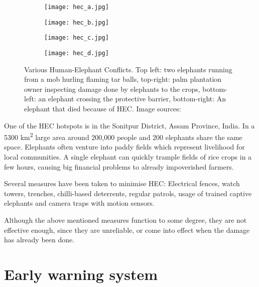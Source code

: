 \begin{figure}[ht]
    \begin{subfigure}{0.5\textwidth}
        \centering
        \texttt{[image: hec\_a.jpg]} 
    \end{subfigure}
    \begin{subfigure}{0.5\textwidth}
        \centering
        \texttt{[image: hec\_b.jpg]} 
    \end{subfigure}
    \begin{subfigure}{0.5\textwidth}
        \centering
        \texttt{[image: hec\_c.jpg]} 
    \end{subfigure}
    \begin{subfigure}{0.5\textwidth}
        \centering
        \texttt{[image: hec\_d.jpg]} 
    \end{subfigure}
\caption[Various Human-Elephant Conflicts.] {Various Human-Elephant Conflicts. Top left: two elephants running from a mob hurling flaming tar balls, top-right: palm plantation owner inspecting damage done by elephants to the crops, bottom-left: an elephant crossing the protective barrier, bottom-right: An elephant that died because of HEC. Image sources:\cite{wildlabs-elephants}\cite{econe_image}\cite{save_our_species_image}\cite{the_week_image}}
    \label{various_hec}
\end{figure}

One of the HEC hotspots is in the Sonitpur District, Assam Province, India. 
In a 5300 km\textsuperscript{2} large area around 200,000 people and 200 elephants share the same space\cite{wildlabs-elephants}.
Elephants often venture into paddy fields which represent livelihood for local communities.
A single elephant can quickly trample fields of rice crops in a few hours, causing big financial problems to already impoverished farmers\cite{wildlabs-elephants}.

Several measures have been taken to minimise HEC: Electrical fences, watch towers, trenches, chilli-based deterrents, regular patrols, usage of trained captive elephants and camera traps with motion sensors.

Although the above mentioned measures function to some degree, they are not effective enough, since they are unreliable, or come into effect when the damage has already been done\cite{wildlabs}. 

\section{ Early warning system}\label{early_detection_system}

